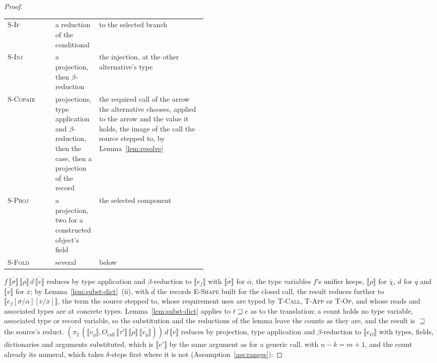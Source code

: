 \begin{proof}
\begin{longtable}{@{}>{\raggedright\arraybackslash}p{0.24\linewidth}>{\raggedright\arraybackslash}p{0.22\linewidth}>{\raggedright\arraybackslash}p{}@{}}
\textsc{S-If} & a reduction of the conditional & to the selected branch \\
\textsc{S-Inj} & a projection, then $\beta$-reduction & the injection, at the other alternative's type \\
\textsc{S-Copair} & projections, type application and $\beta$-reduction, then the case, then a projection of the record & the required call of the arrow the alternative chooses, applied to the arrow and the value it holds, the image of the call the source stepped to, by Lemma~\ref{lem:resolve} \\
\textsc{S-Proj} & a projection, two for a constructed object's field & the selected component \\
\textsc{S-Fold} & several & below \\
\end{longtable}
\addtocounter{table}{-1}
\endgroup
{}$f\,\overline{\llbracket \sigma \rrbracket}\,\overline{\llbracket \rho \rrbracket}\,\overline{d}\,\overline{\llbracket v \rrbracket}$ reduces by type application and $\beta$-reduction to $\llbracket e_f \rrbracket$ with $\overline{\llbracket \sigma \rrbracket}$ for $\overline{\alpha}$, the type variables $f$'s unifier keeps, $\overline{\llbracket \rho \rrbracket}$ for $\overline{\chi}$, $\overline{d}$ for $\overline{q}$ and $\overline{\llbracket v \rrbracket}$ for $\overline{x}$; by Lemma~\ref{lem:subst-dict}~(ii), with $\overline{d}$ the records \textsc{E-Shape} built for the closed call, the result reduces further to $\llbracket e_f[\overline{\sigma}/\overline{\alpha}][\overline{v}/\overline{x}] \rrbracket$, the term the source stepped to, whose requirement uses are typed by \textsc{T-Call}, \textsc{T-App} or \textsc{T-Op}, and whose reads and associated types are at concrete types.
Lemma~\ref{lem:subst-dict} applies to $t \sqsupseteq e$ as to the translation: a count holds no type variable, associated type or record variable, so the substitution and the reductions of the lemma leave the counts as they are, and the result is $\sqsupseteq$ the source's reduct.
$(\pi_2\,(\overline{\llbracket v_y \rrbracket}, O_{\mathrm{call}}\,\overline{\llbracket \tau' \rrbracket}\,\overline{\llbracket \rho \rrbracket}\,\overline{\llbracket v_y \rrbracket}))\,\overline{d}\,\overline{\llbracket v \rrbracket}$ reduces by projection, type application and $\beta$-reduction to $\llbracket e_O \rrbracket$ with types, fields, dictionaries and arguments substituted, which is $\llbracket e' \rrbracket$ by the same argument as for a generic call.
with $n - k = m + 1$, and the count already its numeral, which takes $\delta$-steps first where it is not (Assumption~\ref{ass:ranges}):

\end{proof}
